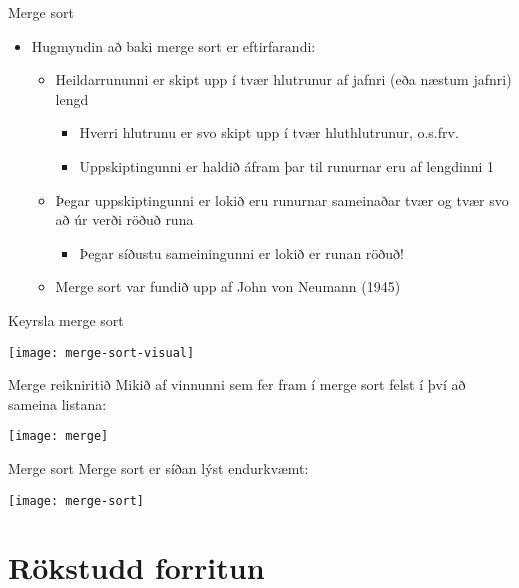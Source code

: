 \documentclass{beamer}
\begin{document}
\begin{frame}{Merge sort}
\begin{itemize}
 \item Hugmyndin að baki merge sort er eftirfarandi:
 \begin{itemize}
  \item Heildarrununni er skipt upp í tvær hlutrunur af jafnri (eða næstum jafnri) lengd
  \begin{itemize}
   \item Hverri hlutrunu er svo skipt upp í tvær hluthlutrunur, o.s.frv.
   \item Uppskiptingunni er haldið áfram þar til runurnar eru af lengdinni 1
  \end{itemize}
  \item Þegar uppskiptingunni er lokið eru runurnar sameinaðar tvær og tvær svo að úr verði röðuð runa
  \begin{itemize}
   \item Þegar síðustu sameiningunni er lokið er runan röðuð!
  \end{itemize}
  \item Merge sort var fundið upp af John von Neumann (1945)
 \end{itemize}
\end{itemize}
\end{frame}

\begin{frame}{Keyrsla merge sort}
\vspace{0.5cm}
\begin{center}
\texttt{[image: merge-sort-visual]}
\end{center}
\end{frame}

\begin{frame}{Merge reikniritið}
Mikið af vinnunni sem fer fram í merge sort felst í því að sameina listana:
\begin{center}
\texttt{[image: merge]}
\end{center}
\end{frame}

\begin{frame}{Merge sort}
Merge sort er síðan lýst endurkvæmt:
\begin{center}
\texttt{[image: merge-sort]}
\end{center}
\end{frame}

\section{Rökstudd forritun}
\end{document}
